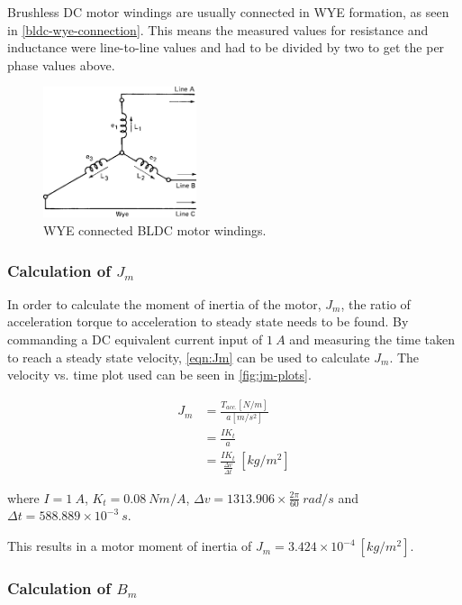 Brushless DC motor windings are usually connected in WYE formation, as seen in \cref{bldc-wye-connection}. This means the measured values for resistance and inductance were line-to-line values and had to be divided by two to get the per phase values above.

\begin{figure}
\centering
\includegraphics[width=0.4\textwidth]{images/motor/wye.jpg} 
\caption{WYE connected BLDC motor windings.}
\label{fig:bldc-wye-connection}
\end{figure}

\subsubsection{Calculation of $J_m$}
In order to calculate the moment of inertia of the motor, $J_m$, the ratio of acceleration torque to acceleration to steady state needs to be found. By commanding a DC equivalent current input of $1\ A$ and measuring the time taken to reach a steady state velocity, \cref{eqn:Jm} can be used to calculate $J_m$. The velocity vs. time plot used can be seen in \cref{fig:jm-plots}.

\begin{equation} \label{eqn:Jm}
\begin{aligned}
J_m &= \frac{T_{acc.}[N/m]}{a[m/s^2]} \\
&= \frac{IK_t}{a} \\
&= \frac{IK_t}{\frac{\Delta v}{\Delta t}}\ [kg/m^2]
\end{aligned}
\end{equation}

where $I=1\ A$, $K_t=0.08\ Nm/A$, $\Delta v = 1313.906\times \frac{2\pi}{60}\ rad/s$ and $\Delta t = 588.889\times10^{-3}\ s$.

This results in a motor moment of inertia of $J_m = 3.424 \times 10^{-4}\ [kg/m^2]$.

\subsubsection{Calculation of $B_m$}

